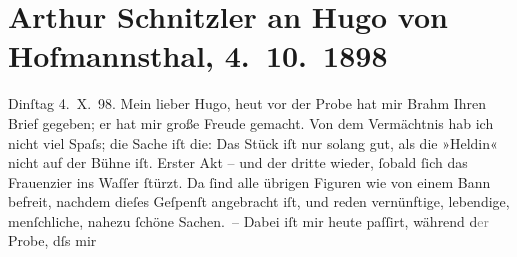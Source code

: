 

         
         \renewcommand{\erwaehntePersonen}{Personen: Otto Brahm, Hugo von Hofmannsthal}
         \renewcommand{\erwaehnteOrte}{Orte: Berlin, Bologna, Le due Torri: Garisenda e degli Asinelli, Wien}
         \renewcommand{\erwaehnteWerke}{Werke: Das Vermächtnis. Schauspiel in drei Akten, Der Abenteurer und die Sängerin oder Die Geschenke des Lebens}
               \section[Arthur Schnitzler an Hugo von Hofmannsthal, 4. 10. 1898]{ Arthur Schnitzler an Hugo von Hofmannsthal, 4. 10. 1898}\nopagebreak{}\rehead{ }\begin{ledgroupsized}[t]{13cm}\normalsize\beginnumbering{} \toendnotes[C]{\smallbreak\pagebreak[2]} 
\toendnotes[C]{\smallbreak}\pstart
           {\pb}Dinſtag 4. X. 98.\pend
           \pstart
           Mein lieber Hugo, heut vor der Probe hat mir Brahm Ihren Brief gegeben; er hat mir große Freude gemacht. Von
               dem Vermächtnis hab ich nicht viel Spaſs; die
               Sache iſt die: Das Stück iſt nur solang gut, als die »Heldin« nicht auf der Bühne
               iſt. Erster Akt – und der dritte wieder, ſobald ſich das Frauenzi{\geminationm}er ins {\pb}Waſſer ſtürzt. Da
               ſind alle übrigen Figuren wie von einem Bann befreit, nachdem dieſes Geſpenſt
               angebracht iſt, und reden vernünftige, lebendige, menſchliche, nahezu ſchöne
               Sachen. – Dabei iſt mir heute paſſirt, während d\textcolor{gray}{er} Probe, dſs mir

\end{ledgroupsized}
